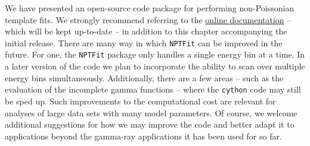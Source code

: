 We have presented an open-source code package for performing non-Poissonian template fits.   We strongly recommend referring to the \href{http://nptfit.readthedocs.io}{online documentation} -- which will be kept up-to-date -- in addition to this chapter accompanying the initial release.  There are many way in which \texttt{NPTFit} can be improved in the future.  For one, the  \texttt{NPTFit} package only handles a single energy bin at a time.  In a later version of the code we plan to incorporate the ability to scan over multiple energy bins simultaneously.  Additionally, there are a few areas -- such as the evaluation of the incomplete gamma functions -- where the \texttt{cython} code may still be sped up.  Such improvements to the computational cost are relevant for analyses of large data sets with many model parameters.  Of course, we welcome additional suggestions for how we may improve the code and better adapt it to applications beyond the gamma-ray applications it has been used for so far. 

